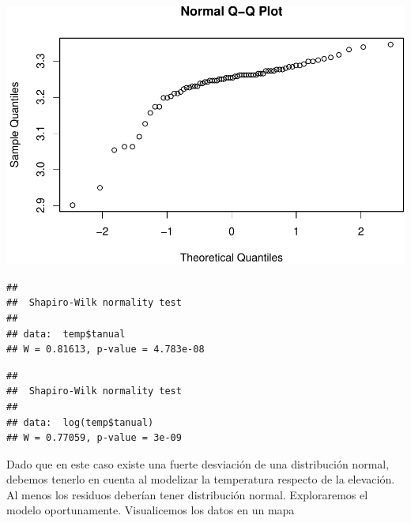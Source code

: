 \documentclass[11pt,]{article}
\newenvironment{Shaded}{\begin{snugshade}}{\end{snugshade}}
\newcommand{\KeywordTok}[1]{\textcolor[rgb]{0.13,0.29,0.53}{\textbf{#1}}}
\newcommand{\OperatorTok}[1]{\textcolor[rgb]{0.81,0.36,0.00}{\textbf{#1}}}
\newcommand{\NormalTok}[1]{#1}
\begin{document}
\begin{Shaded}
\end{Shaded}

\includegraphics[width=600px]{Proyecto-Precipitaciones_files/figure-latex/esda-temp-4}

\begin{Shaded}
\end{Shaded}

\begin{verbatim}
## 
##  Shapiro-Wilk normality test
## 
## data:  temp$tanual
## W = 0.81613, p-value = 4.783e-08
\end{verbatim}

\begin{Shaded}
\end{Shaded}

\begin{verbatim}
## 
##  Shapiro-Wilk normality test
## 
## data:  log(temp$tanual)
## W = 0.77059, p-value = 3e-09
\end{verbatim}

Dado que en este caso existe una fuerte desviación de una distribución
normal, debemos tenerlo en cuenta al modelizar la temperatura respecto
de la elevación. Al menos los residuos deberían tener distribución
normal. Exploraremos el modelo oportunamente. Visualicemos los datos en
un mapa
\end{document}
